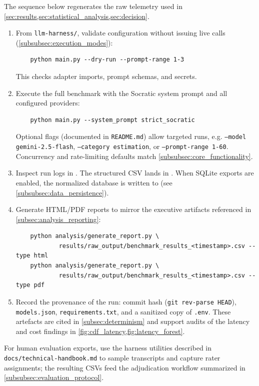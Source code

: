 The sequence below regenerates the raw telemetry used in \cref{sec:results,sec:statistical_analysis,sec:decision}.

\begin{enumerate}
	\item From \texttt{llm-harness/}, validate configuration without issuing live calls (\cref{subsubsec:execution_modes}):
	\begin{verbatim}
	python main.py --dry-run --prompt-range 1-3
	\end{verbatim}
	This checks adapter imports, prompt schemas, and secrets.
	\item Execute the full benchmark with the Socratic system prompt and all configured providers:
	\begin{verbatim}
	python main.py --system_prompt strict_socratic
	\end{verbatim}
	Optional flags (documented in \texttt{README.md}) allow targeted runs, e.g. \texttt{--model gemini-2.5-flash}, \texttt{--category estimation}, or \texttt{--prompt-range 1-60}. Concurrency and rate-limiting defaults match \cref{subsubsec:core_functionality}.
	\item Inspect run logs in . The structured CSV lands in . When SQLite exports are enabled, the normalized database is written to  (see \cref{subsubsec:data_persistence}).
	\item Generate HTML/PDF reports to mirror the executive artifacts referenced in \cref{subsec:analysis_reporting}:
	\begin{verbatim}
	python analysis/generate_report.py \
			results/raw_output/benchmark_results_<timestamp>.csv --type html
	python analysis/generate_report.py \
			results/raw_output/benchmark_results_<timestamp>.csv --type pdf
	\end{verbatim}
	\item Record the provenance of the run: commit hash (\texttt{git rev-parse HEAD}), \texttt{models.json}, \texttt{requirements.txt}, and a sanitized copy of \texttt{.env}. These artefacts are cited in \cref{subsec:determinism} and support audits of the latency and cost findings in \cref{fig:cdf_latency,fig:latency_forest}.
\end{enumerate}

For human evaluation exports, use the harness utilities described in \texttt{docs/technical-handbook.md} to sample transcripts and capture rater assignments; the resulting CSVs feed the adjudication workflow summarized in \cref{subsubsec:evaluation_protocol}.

